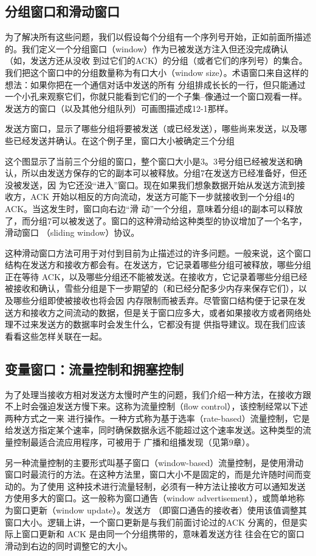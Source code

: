 \subsection{分组窗口和滑动窗口}
为了解决所有这些问题，我们以假设每个分组有一个序列号开始，正如前面所描述的。我们定义一个分组窗口（window）作为已被发送方注入但还没完成确认（如，发送方还从没收
到过它们的ACK）的分组（或者它们的序列号）的集合。我们把这个窗口中的分组数量称为有口大小（window size）。术语窗口来自这样的想法：如果你把在一个通信对话中发送的所有
分组排成长长的一行，但只能通过一个小孔来观察它们，你就只能看到它们的一个子集--像通过一个窗口观看一样。发送方的窗口（以及其他分组队列）可画图描述成12-1那样。

发送方窗口，显示了哪些分组将要被发送（或已经发送），哪些尚来发送，以及哪些已经发送并确认。在这个例子里，窗口大小被确定三个分组

这个图显示了当前三个分组的窗口，整个窗口大小是3。3号分组已经被发送和确认，所以由发送方保存的它的副本可以被释放。分组7在发送方已经准备好，但还没被发送，因
为它还没“进入”窗口。现在如果我们想象数据开始从发送方流到接收方，ACK 开始以相反的方向流动，发送方可能下一步就接收到一个分组4的ACK。当这发生时，窗口向右边“滑
动”一个分组，意味着分组4的副本可以释放了，而分组7可以被发送了。窗口的这种滑动给这种类型的协议增加了一个名字，滑动窗口 （sliding window）协议。

这种滑动窗口方法可用于对付到目前为止描述过的许多问题。一般来说，这个窗口结构在发送方和接收方都会有。在发送方，它记录着哪些分组可被释放，哪些分组正在等待
ACK，以及哪些分组还不能被发送。在接收方，它记录着哪些分组已经被接收和确认，雪些分组是下一步期望的（和已经分配多少内存来保存它们），以及哪些分组即使被接收也将会因
内存限制而被丢弃。尽管窗口结构便于记录在发送方和接收方之间流动的数据，但是关于窗口应多大，或者如果接收方或者网络处理不过来发送方的数据率时会发生什么，它都没有提
供指导建议。现在我们应该看看这些怎样关联在一起。


\subsection{变量窗口：流量控制和拥塞控制}
为了处理当接收方相对发送方太慢时产生的问题，我们介绍一种方法，在接收方跟不上时会强迫发送方慢下来。这称为流量控制（flow control），该控制经常以下述两种方式之一来
进行操作。一种方式称为基于选率（rate-based）流量控制，它是给发送方指定某个速率，同时确保数据永远不能超过这个速率发送。这种类型的流量控制最适合流应用程序，可被用于
广播和组播发现（见第9章）。

另一种流量控制的主要形式叫基子窗口（window-based）流量控制，是使用滑动窗口时最流行的方法。在这种方法里，窗口大小不是固定的，而是允许随时间而变动的。为了使用
这种技术进行流量轻制，必须有一种方法让接收方可以通知发送方使用多大的窗口。这一般称为窗口通告（window advertisement），或筒单地称为窗口更新（window update）。发送方
（即窗口通告的接收者）使用该值调整其窗口大小。逻辑上讲，一个窗口更新是与我们前面讨论过的ACK 分离的，但是实际上窗口更新和 ACK 是由同一个分组携带的，意味着发送方往
往会在它的窗口滑动到右边的同时调整它的大小。

